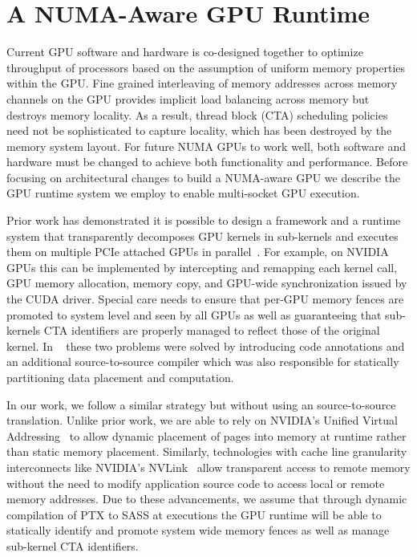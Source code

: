 \section{A NUMA-Aware GPU Runtime}

Current GPU software and hardware is co-designed together to optimize 
throughput of processors based on the assumption of uniform memory properties 
within the GPU. Fine grained interleaving of memory addresses across memory 
channels on the GPU provides implicit load balancing across memory but destroys 
memory locality.  As a result, thread block (CTA) scheduling policies need not 
be sophisticated to capture locality, which has been destroyed by the 
memory system layout.  For future NUMA GPUs to work well, both software and 
hardware must be changed to achieve both functionality and performance.  Before 
focusing on architectural changes to build a NUMA-aware GPU we describe the GPU 
runtime system we employ to enable multi-socket GPU execution.

Prior work has demonstrated it is possible to design a framework and a runtime 
system that transparently decomposes GPU kernels in sub-kernels and executes 
them on multiple PCIe attached GPUs in parallel~\cite{Cabezas2015}. For example, on NVIDIA GPUs 
this can be implemented by intercepting and remapping each kernel call, GPU 
memory allocation, memory copy, and GPU-wide synchronization issued by the CUDA 
driver. Special care needs to ensure that per-GPU memory fences are promoted to 
system level and seen by all GPUs as well as guaranteeing that sub-kernels CTA 
identifiers are properly managed to reflect those of the original kernel. In 
~\cite{Cabezas2015} these two problems were solved by introducing  code 
annotations and an additional source-to-source compiler which was also 
responsible for statically partitioning data placement and computation.

In our work, we follow a similar strategy but without using an source-to-source
translation. Unlike prior work, we are able to rely on NVIDIA's Unified Virtual 
Addressing~\cite{UVM} to allow dynamic placement of pages into memory at
runtime rather than static memory placement.  Similarly, technologies with
cache line granularity interconnects like NVIDIA's NVLink~\cite{NVLINK} allow
transparent access to remote memory without the need to modify application
source code to access local or remote memory addresses.  Due to these
advancements, we assume that through dynamic compilation of PTX to SASS at
executions the GPU runtime will be able to statically identify and promote 
system wide memory fences as well as manage sub-kernel CTA identifiers.

